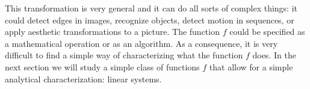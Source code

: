 This transformation is very general and it can do all sorts of complex things: it could detect edges in images, recognize objects, detect motion in sequences, or apply aesthetic transformations to a picture. The function $f$ could be specified as a mathematical operation or as an algorithm.
As a consequence, it is very difficult to find a simple way of characterizing what the function $f$ does. In the next section we will study a simple class of functions $f$ that allow for a simple analytical characterization: linear systems.



%
%
%
%
%
%
%
%
%
%
